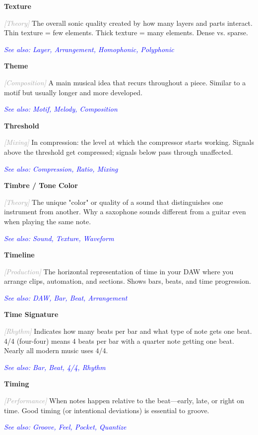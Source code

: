 \documentclass[11pt,letterpaper]{article}
\newcommand{\term}[1]{\textbf{\large\color{purple}#1}}
\newcommand{\category}[1]{\textcolor{darkgray}{\textit{\small [#1]}}}
\newcommand{\seealso}[1]{\textcolor{blue}{\textit{See also: #1}}}
\newenvironment{termdef}[1]
  {\noindent\term{#1}\par\nopagebreak}
  {\par\vspace{0.3em}}
\begin{document}
\begin{termdef}{Texture}
\category{Theory}
The overall sonic quality created by how many layers and parts interact. Thin texture = few elements. Thick texture = many elements. Dense vs. sparse.

\seealso{Layer, Arrangement, Homophonic, Polyphonic}
\end{termdef}

\begin{termdef}{Theme}
\category{Composition}
A main musical idea that recurs throughout a piece. Similar to a motif but usually longer and more developed.

\seealso{Motif, Melody, Composition}
\end{termdef}

\begin{termdef}{Threshold}
\category{Mixing}
In compression: the level at which the compressor starts working. Signals above the threshold get compressed; signals below pass through unaffected.

\seealso{Compression, Ratio, Mixing}
\end{termdef}

\begin{termdef}{Timbre / Tone Color}
\category{Theory}
The unique "color" or quality of a sound that distinguishes one instrument from another. Why a saxophone sounds different from a guitar even when playing the same note.

\seealso{Sound, Texture, Waveform}
\end{termdef}

\begin{termdef}{Timeline}
\category{Production}
The horizontal representation of time in your DAW where you arrange clips, automation, and sections. Shows bars, beats, and time progression.

\seealso{DAW, Bar, Beat, Arrangement}
\end{termdef}

\begin{termdef}{Time Signature}
\category{Rhythm}
Indicates how many beats per bar and what type of note gets one beat. 4/4 (four-four) means 4 beats per bar with a quarter note getting one beat. Nearly all modern music uses 4/4.

\seealso{Bar, Beat, 4/4, Rhythm}
\end{termdef}

\begin{termdef}{Timing}
\category{Performance}
When notes happen relative to the beat—early, late, or right on time. Good timing (or intentional deviations) is essential to groove.

\seealso{Groove, Feel, Pocket, Quantize}
\end{termdef}
\end{document}
